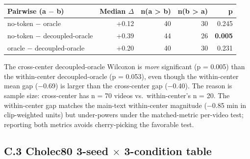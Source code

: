 \begin{longtable}[]{@{}lrrrr@{}}
\toprule\noalign{}
Pairwise (a $-$ b) & Median $\Delta$ & n(a \textgreater{} b) & n(b \textgreater{}
a) & p \\
\midrule\noalign{}
\endhead
\bottomrule\noalign{}
\endlastfoot
no-token $-$ oracle & +0.12 & 40 & 30 & 0.245 \\
no-token $-$ decoupled-oracle & +0.39 & 44 & 26 & \textbf{0.005} \\
oracle $-$ decoupled-oracle & +0.20 & 40 & 30 & 0.231 \\
\end{longtable}

The cross-center decoupled-oracle Wilcoxon is \emph{more} significant (p
= 0.005) than the within-center decoupled-oracle (p = 0.053), even
though the within-center mean gap ($-$0.69) is larger than the
cross-center gap ($-$0.40). The reason is sample size: cross-center has n
= 70 videos vs.~within-center's n = 20. The within-center gap matches
the main-text within-center magnitude ($-$0.85 min in clip-weighted units) but under-powers
under the matched-metric per-video test; reporting both metrics avoids
cherry-picking the favorable test.

\subsection{C.3 Cholec80 3-seed $\times$ 3-condition
table}\label{c.3-cholec80-3-seed-3-condition-table}

